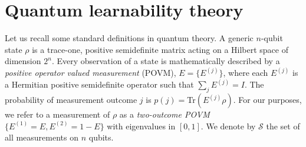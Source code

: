 \documentclass[aps,superscriptaddress,nofootinbib,twocolumn]{revtex4-1}
\begin{document}
\section*{Quantum learnability theory}\label{sec:learningQstates}

Let us recall some standard definitions in quantum theory. A generic $n$-qubit state $\rho $ is a trace-one, positive semidefinite matrix acting on a Hilbert
space of dimension $2^{n}$. Every observation of
a state is mathematically described by a \textit{positive operator valued measurement} (POVM), $E=\{E^{(j)}\}$, where each $E^{(j)}$ is a Hermitian
positive semidefinite operator such that $\sum_{j}E^{(j)}= I$. The probability of measurement outcome $j$ is $p(j)=$Tr$(E^{(j)}\rho )$. For our purposes, we refer to a measurement of $\rho $ as a \textit{two-outcome POVM} $%
\{E^{(1)}=E,E^{(2)}=1-E\}$ with eigenvalues in $[0,1]$. We denote by $\mathcal{S}$ the set of all measurements on $n$ qubits.  
\end{document}
